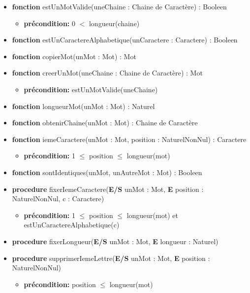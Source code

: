 	\begin{itemize}[label=$\ $, leftmargin=1cm]
		 \item \textbf{fonction} estUnMotValide(uneChaine : Chaine de Caractère) : Booleen
		 \begin{itemize}[label=$| $]
		\item \textbf{précondition:} 0 $<$ longueur(chaine)
	     \end{itemize}
		 \item \textbf{fonction} estUnCaractereAlphabetique(unCaractere : Caractere) : Booleen
		 \item \textbf{fonction} copierMot(unMot : Mot) : Mot
		 \item \textbf{fonction} creerUnMot(uneChaine : Chaine de Caractère) : Mot
		 \begin{itemize}[label=$| $]
		\item \textbf{précondition:} estUnMotValide(uneChaine)
	     \end{itemize}
		 \item \textbf{fonction} longueurMot(unMot : Mot) : Naturel
		 \item \textbf{fonction} obtenirChaine(unMot : Mot) : Chaine de Caractère
		 \item \textbf{fonction} iemeCaractere(unMot : Mot, position : NaturelNonNul) : Caractere
		 \begin{itemize}[label=$| $]
            \item \textbf{précondition:} 1 $\leq$ position $\leq$ longueur(mot)
         \end{itemize}
         \item \textbf{fonction} sontIdentiques(unMot, unAutreMot : Mot) : Booleen
         \item \textbf{procedure} fixerIemeCaractere(\textbf{E/S} unMot : Mot, \textbf{E} position : NaturelNonNul, c : Caractere)
         \begin{itemize}[label=$| $]
            \item \textbf{précondition:} 1 $\leq$ position $\leq$ longueur(mot) et estUnCaractereAlphabetique(c)
         \end{itemize}
         \item \textbf{procedure} fixerLongueur(\textbf{E/S} unMot : Mot, \textbf{E} longueur : Naturel)
         \item \textbf{procedure} supprimerIemeLettre(\textbf{E/S} unMot : Mot, \textbf{E} position : NaturelNonNul)
         \begin{itemize}[label=$| $]
            \item \textbf{précondition:} position $\leq$ longueur(mot)

\end{itemize}
\end{itemize}
